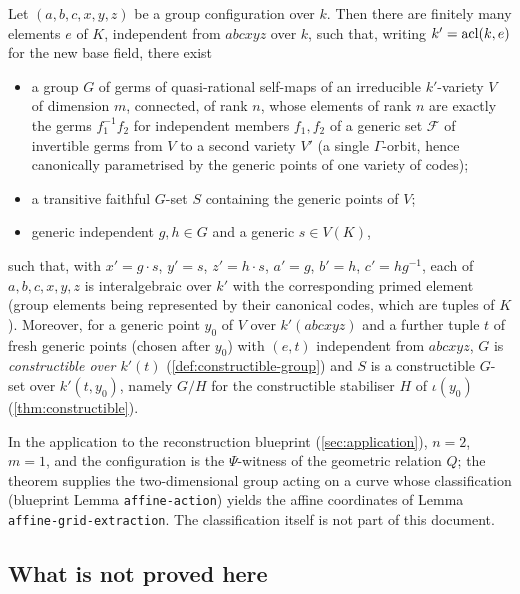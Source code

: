 \begin{theorem}
\label{thm:main-informal}
Let $(a,b,c,x,y,z)$ be a group configuration over $k$.  Then there are finitely many
elements $e$ of $K$, independent from $abcxyz$ over $k$, such that, writing
$k'=\operatorname{acl}(k,e)$ for the new base field, there exist
\begin{itemize}[nosep]
\item a group $G$ of germs of quasi-rational self-maps of an irreducible $k'$-variety
  $V$ of dimension $m$, connected, of rank $n$, whose elements of rank $n$ are exactly
  the germs $f_1^{-1}f_2$ for independent members $f_1,f_2$ of a generic set $\mathcal F$
  of invertible germs from $V$ to a second variety $V'$ (a single $\Gamma$-orbit, hence
  canonically parametrised by the generic points of one variety of codes);
\item a transitive faithful $G$-set $S$ containing the generic points of $V$;
\item generic independent $g,h\in G$ and a generic $s\in V(K)$,
\end{itemize}
such that, with $x'=g\cdot s$, $y'=s$, $z'=h\cdot s$, $a'=g$, $b'=h$, $c'=hg^{-1}$,
each of $a,b,c,x,y,z$ is interalgebraic over $k'$ with the corresponding primed
element (group elements being represented by their canonical codes, which are tuples
of $K$).  Moreover, for a generic point $y_0$ of $V$ over $k'(abcxyz)$ and a further
tuple $t$ of fresh generic points (chosen after $y_0$) with $(e,t)$ independent from
$abcxyz$, $G$ is \emph{constructible over $k'(t)$} (\cref{def:constructible-group}) and
$S$ is a constructible $G$-set over $k'(t,y_0)$, namely $G/H$ for the constructible
stabiliser $H$ of $\iota(y_0)$ (\cref{thm:constructible}).
\end{theorem}

In the application to the reconstruction blueprint (\cref{sec:application}),
$n=2$, $m=1$, and the configuration is the $\Psi$-witness of the geometric
relation $Q$; the theorem supplies the two-dimensional group acting on a curve whose
classification (blueprint Lemma \texttt{affine-action}) yields the affine coordinates
of Lemma \texttt{affine-grid-extraction}.  The classification itself is not part of
this document.

\subsection{What is not proved here}

